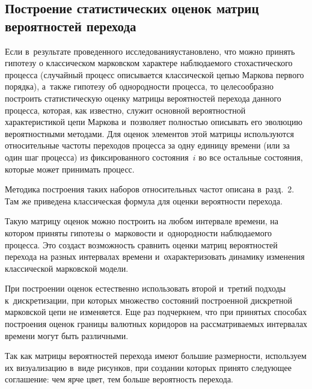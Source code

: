 \begin{multicols}{2}
  \vspace*{-6pt}

\section{Построение статистических оценок матриц вероятностей 
перехода}

  \vspace*{-2pt}
  
  Если в~результате проведенного исследования\linebreak установлено, что можно 
принять гипотезу о классическом марковском характере наблюдаемого 
стохастического процесса (случайный процесс описывается классической 
цепью Маркова первого \mbox{порядка}), а~также гипотезу об однородности процесса, 
то целесообразно построить статистическую оценку матрицы вероятностей 
перехода данного процесса, которая, как известно, служит основной 
вероятностной характеристикой цепи Маркова и~позволяет полностью 
описывать его эволюцию вероятностными методами. Для оценок элементов 
этой матрицы используются относительные частоты переходов процесса за 
одну единицу времени (или за один шаг процесса) из фиксированного 
состояния~$i$ во все остальные состояния, которые может принимать процесс. 

Методика по\-стро\-ения таких наборов относительных час\-тот описана в~разд.~2. 
Там же приведена классическая формула для оценки ве\-ро\-ят\-ности перехода. 

Такую мат\-ри\-цу оценок мож\-но по\-стро\-ить на любом интервале времени, на 
котором приняты гипотезы о~мар\-ко\-вости и~однородности на\-блю\-да\-емо\-го 
процесса. Это создаст воз\-мож\-ность сравнить оценки мат\-риц вероятностей 
перехода на разных интервалах времени и~охарактеризовать динамику 
изменения классической марковской мо\-дели.


  
  При построении оценок естественно использовать второй и~третий подходы 
  к~дискретизации, при которых множество состояний построенной дискретной 
марковской цепи не изменяется. Еще раз подчеркнем, что при принятых 
способах построения оценок границы валютных коридоров на 
рассматриваемых интервалах времени могут быть различными.
  
  Так как матрицы вероятностей перехода имеют большие размерности, 
используем их визуализацию в~виде рисунков, при создании которых принято 
следующее соглашение: чем ярче цвет, тем больше вероятность перехода.
  

\end{multicols}
